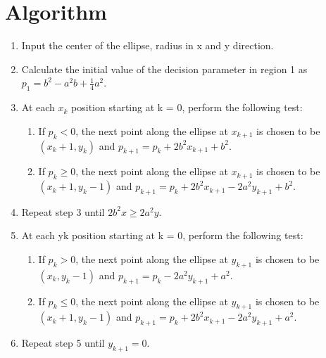 \documentclass[12pt]{article}
\begin{document}
	\section{Algorithm}
	\begin{enumerate}
		\item Input the center of the ellipse, radius in x and y direction.
		\item Calculate the initial value of the decision parameter in region 1 as $p_1 = b^2 - a^2b + \frac{1}{4}a^2$.
		\item At each $x_k$ position starting at k = 0, perform the following test:
		\begin{enumerate}
			\item If $p_k < 0$, the next point along the ellipse at $x_{k+1}$ is chosen to be $(x_k + 1, y_k)$ and $p_{k+1} = p_k + 2b^2x_{k+1} + b^2$.
			\item If $p_k \geq 0$, the next point along the ellipse at $x_{k+1}$ is chosen to be $(x_k + 1, y_k - 1)$ and $p_{k+1} = p_k + 2b^2x_{k+1} - 2a^2y_{k+1} + b^2$.
		\end{enumerate}
		\item Repeat step 3 until $2b^2x \geq 2a^2y$.
		\item At each yk position starting at k = 0, perform the following test:
		\begin{enumerate}
			\item If $p_k > 0$, the next point along the ellipse at $y_{k+1}$ is chosen to be $(x_k, y_k - 1)$ and $p_{k+1} = p_k - 2a^2y_{k+1} + a^2$.
			\item If $p_k \leq 0$, the next point along the ellipse at $y_{k+1}$ is chosen to be $(x_k + 1, y_k - 1)$ and $p_{k+1} = p_k + 2b^2x_{k+1} - 2a^2y_{k+1} + a^2$.
		\end{enumerate}
		\item Repeat step 5 until $y_{k+1} = 0$.
	\end{enumerate}
\end{document}

